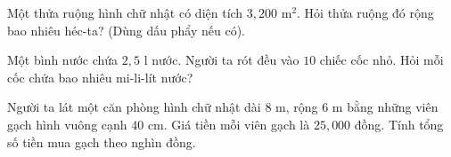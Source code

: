 \begin{ex} %
Một thửa ruộng hình chữ nhật có diện tích $3,200\text{ m}^2$. Hỏi thửa ruộng đó rộng bao nhiêu héc-ta? (Dùng dấu phẩy nếu có).
\end{ex}

\begin{ex} %
Một bình nước chứa $2{,}5\text{ l}$ nước. Người ta rót đều vào $10$ chiếc cốc nhỏ. Hỏi mỗi cốc chứa bao nhiêu mi-li-lít nước?
\end{ex}

\begin{ex} %
Người ta lát một căn phòng hình chữ nhật dài $8\text{ m}$, rộng $6\text{ m}$ bằng những viên gạch hình vuông cạnh $40\text{ cm}$. Giá tiền mỗi viên gạch là $25,000$ đồng. Tính tổng số tiền mua gạch theo nghìn đồng.
\end{ex}
